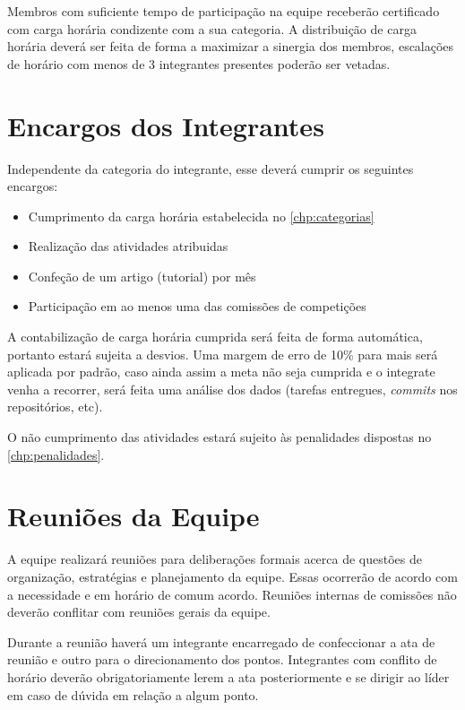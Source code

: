 Membros com suficiente tempo de participação na equipe receberão certificado com carga horária condizente com a sua categoria. A distribuição de carga horária deverá ser feita de forma a maximizar a sinergia dos membros, escalações de horário com menos de 3 integrantes presentes poderão ser vetadas.


\chapter{Encargos dos Integrantes}
\label{chp:encargos}

Independente da categoria do integrante, esse deverá cumprir os seguintes encargos:

\begin{itemize}
\item Cumprimento da carga horária estabelecida no \autoref{chp:categorias}
\item Realização das atividades atribuidas
\item Confeção de um artigo (tutorial) por mês
\item Participação em ao menos uma das comissões de competições
\end{itemize}

A contabilização de carga horária cumprida será feita de forma automática, portanto estará sujeita a desvios. Uma margem de erro de 10\% para mais será aplicada por padrão, caso ainda assim a meta não seja cumprida e o integrate venha a recorrer, será feita uma análise dos dados (tarefas entregues, \textit{commits} nos repositórios, etc).

O não cumprimento das atividades estará sujeito às penalidades dispostas no \autoref{chp:penalidades}. 

\chapter{Reuniões da Equipe}
\label{chp:reunioes}

A equipe realizará reuniões para deliberações formais acerca de questões de organização, estratégias e planejamento da equipe. Essas ocorrerão de acordo com a necessidade e em horário de comum acordo. Reuniões internas de comissões não deverão conflitar com reuniões gerais da equipe.

Durante a reunião haverá um integrante encarregado de confeccionar a ata de reunião e outro para o direcionamento dos pontos. Integrantes com conflito de horário deverão obrigatoriamente lerem a ata posteriormente e se dirigir ao líder em caso de dúvida em relação a algum ponto.

